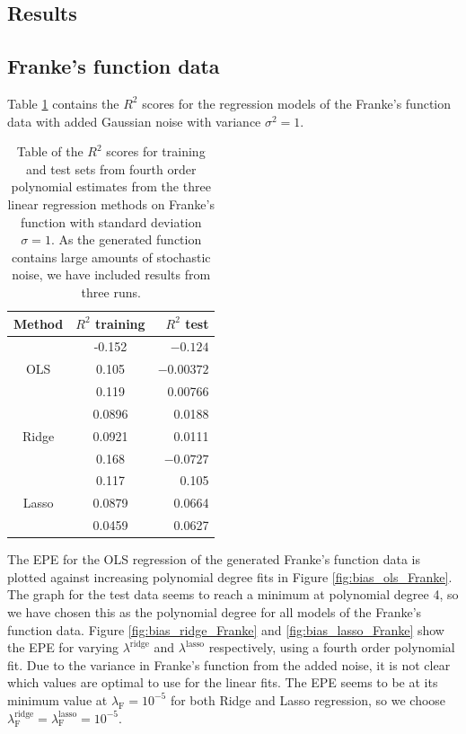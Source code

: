 \documentclass[a4paper, 10pt]{article}
\begin{document}
\begin{multicols}{2}
\section{Results}
\subsection{Franke's function data}
Table \ref{tab:R2_stddev=1} contains the $R^2$ scores for the regression models of the Franke's function data with added Gaussian noise with variance $\sigma^2 = 1$.

\begin{table}[H]
\caption{Table of the $R^2$ scores for training and test sets from fourth order polynomial estimates from  the three linear regression methods on Franke's function with standard deviation $\sigma=1$. As the generated function contains large amounts of stochastic noise, we have included results from three runs.\vspace{2pt}}

\label{tab:R2_stddev=1}
\centering
\begin{tabular}{|c|c|r|} \hline
Method & $R^2$ training & $R^2$ test \\ \hline
\multirow{3}{*}{OLS} & -0.152& $-0.124$\\
											& 0.105 & $-0.00372$ \\
											& 0.119   & 0.00766\\ \cline{1-3}
\multirow{3}{*}{Ridge} & 0.0896 & 0.0188\\
											& 0.0921   & 0.0111 \\
											& 0.168      & $-0.0727$\\ \cline{1-3}
\multirow{3}{*}{Lasso} & 0.117& 0.105\\
											& 0.0879   & 0.0664 \\
											& 0.0459 & 0.0627\\ \cline{1-3}
\end{tabular}
\end{table}

The EPE for the OLS regression of the generated Franke's function data is plotted against increasing polynomial degree fits in Figure \ref{fig:bias_ols_Franke}.  The graph for the test data seems to reach a minimum at polynomial degree 4, so we have chosen this as the polynomial degree for all models of the Franke's function data. Figure \ref{fig:bias_ridge_Franke} and \ref{fig:bias_lasso_Franke} show the EPE for varying $\lambda^\text{ridge}$ and $\lambda^\text{lasso}$ respectively, using a fourth order polynomial fit. Due to the variance in Franke's function from the added  noise, it is not clear which values are optimal to use for the linear fits. The EPE seems to be at its minimum value at $\lambda_\text{F}=10^{-5}$ for both Ridge and Lasso regression, so we choose $\lambda^\text{ridge}_\text{F} = \lambda^\text{lasso}_\text{F}=10^{-5}$.
\end{multicols}
\end{document}
